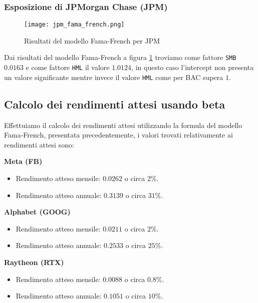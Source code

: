 \pagebreak

\subsubsection{Esposizione di JPMorgan Chase (JPM)}

\begin{figure}[ht]
    \centering
    \texttt{[image: jpm\_fama\_french.png]}
    \caption{Risultati del modello Fama-French per JPM}
    \label{fig:jpm_fama_french}
\end{figure}

Dai risultati del modello Fama-French a figura \ref{fig:jpm_fama_french} troviamo come fattore \verb|SMB| $0.0163$ e come fattore \verb|HML| il valore $1.0124$, 
in questo caso l'intercept non presenta un valore significante mentre invece il valore \verb|HML| come per BAC supera $1$.

\subsection{Calcolo dei rendimenti attesi usando beta}

Effettuiamo il calcolo dei rendimenti attesi utilizzando la formula del modello Fama-French, presentata precedentemente, i valori trovati
relativamente ai rendimenti attesi sono:

\textbf{Meta (FB)}

\begin{itemize}
    \item Rendimento atteso mensile: $0.0262$ o circa $2\%$.
    \item Rendimento atteso annuale: $0.3139$ o circa $31\%$.
\end{itemize}

\textbf{Alphabet (GOOG)}

\begin{itemize}
    \item Rendimento atteso mensile: $0.0211$ o circa $2\%$.
    \item Rendimento atteso annuale: $0.2533$ o circa $25\%$.
\end{itemize}

\textbf{Raytheon (RTX)}

\begin{itemize}
    \item Rendimento atteso mensile: $0.0088$ o circa $0.8\%$.
    \item Rendimento atteso annuale: $0.1051$ o circa $10\%$.
\end{itemize}

